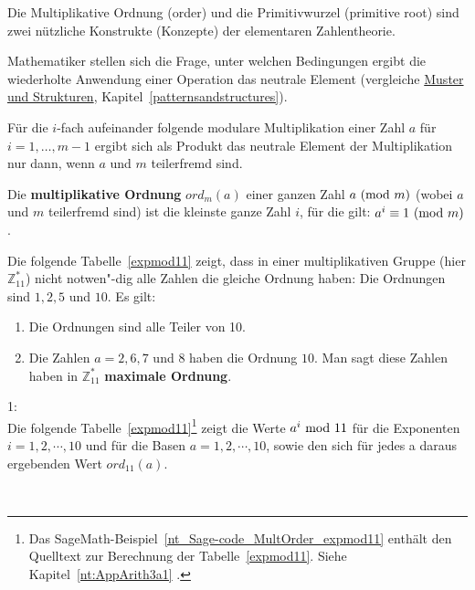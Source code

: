 \begin{refsegment}
Die Multiplikative Ordnung (order) und die Primitivwurzel (primitive root)
sind zwei nützliche Konstrukte (Konzepte) der elementaren Zahlentheorie.

Mathematiker stellen sich die Frage, unter welchen Bedingungen ergibt
die wiederholte Anwendung einer Operation das neutrale Element
(vergleiche \hyperlink{patternsandstructures}{Muster und Strukturen},
Kapitel~\ref{patternsandstructures}).

Für die $i$-fach aufeinander folgende modulare Multiplikation einer
Zahl $a$ für \mbox{$i=1, \dots, m-1$} ergibt sich als Produkt das neutrale
Element der Multiplikation nur dann, wenn $a$ und $m$
teilerfremd sind.

\begin{definition}\label{def-zth-ordn}
Die \textbf{multiplikative Ordnung} 
$ord_m(a)$ einer ganzen Zahl $a {\rm ~(mod~} m)$ (wobei $a$ und $m$
teilerfremd sind) ist die kleinste ganze Zahl $i$, für die gilt:
 $a^i \equiv 1 {\rm ~(mod~} m)$.
\end{definition}

Die folgende Tabelle~\ref{expmod11} zeigt, dass in einer multiplikativen Gruppe
(hier $\mathbb{Z}_{11}^*$) nicht notwen"-dig alle Zahlen die gleiche Ordnung
haben: Die Ordnungen sind $1, 2, 5$ und $10$. Es gilt:
\begin{enumerate}
  \item Die Ordnungen sind alle Teiler von 10.
  \item Die Zahlen $a = 2, 6, 7$ und $8$ haben die Ordnung $10$.
        Man sagt diese Zahlen haben in $\mathbb{Z}_{11}^*$
        \textbf{maximale Ordnung}.
\end{enumerate}

\newpage
\begin{example}{ 1:}\\
Die folgende Tabelle~\ref{expmod11}\footnote{%
  Das SageMath-Beispiel~\ref{nt_Sage-code_MultOrder_expmod11} enthält den
  Quelltext zur Berechnung der Tabelle~\ref{expmod11}.
  Siehe Kapitel~\ref{nt:AppArith3a1} \glqq {}\grqq.}
zeigt die Werte $a^i{\rm ~mod~}11$ für die Exponenten $i = 1, 2, \cdots, 10$
und für die Basen $a = 1, 2, \cdots, 10$, sowie den sich für jedes a daraus
ergebenden Wert $ord_{11}(a)$.
\end{example}\\


\end{refsegment}
